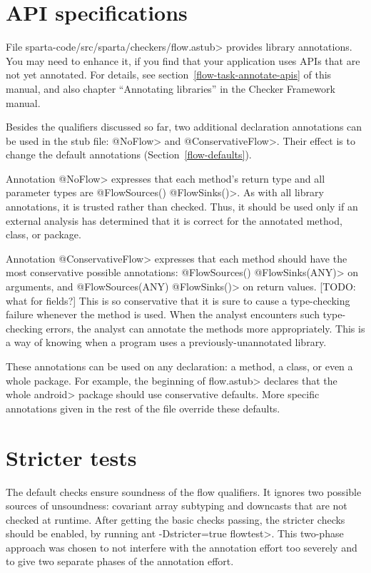 \section{API specifications}

File \<sparta-code/src/sparta/checkers/flow.astub> provides library
annotations.  You may need to enhance it, if you find that your application
uses APIs that are not yet annotated.  For details, see
section~\ref{flow-task-annotate-apis} of this manual, and also 
chapter
``Annotating libraries'' in the Checker Framework manual.

\label{ConservativeFlow}

Besides the qualifiers discussed so far, two additional declaration
annotations can be used in the stub file: \<@NoFlow> and \<@ConservativeFlow>.
Their effect is to change the default annotations (Section~\ref{flow-defaults}).

Annotation \<@NoFlow> expresses that each method's return type and all
parameter types are \<@FlowSources({}) @FlowSinks({})>.  As with all
library annotations, it is trusted rather than checked.  Thus, it should be
used only if an external analysis has determined that it is correct for the
annotated method, class, or package.

Annotation \<@ConservativeFlow> expresses that each method should have the
most conservative possible annotations:
  \<@FlowSources({}) @FlowSinks(ANY)> on arguments, and
  \<@FlowSources(ANY) @FlowSinks({})> on return values.
[TODO: what for fields?]
This is so conservative that it is sure to cause a type-checking failure
whenever the method is used.
When the analyst encounters such type-checking errors, the analyst can
annotate the methods more appropriately.  This is a way of knowing when a
program uses a previously-unannotated library.

These annotations can be used on any declaration: a method, a class,
or even a whole package.
For example, the beginning of \<flow.astub> declares that the
whole \<android> package should use conservative defaults.
More specific annotations given in the rest of the file override these
defaults.


\section{Stricter tests}

The default checks ensure soundness of the flow qualifiers.
It ignores two possible sources of unsoundness: covariant array
subtyping and downcasts that are not checked at runtime.
After getting the basic checks passing, the stricter checks should be
enabled, by running \<ant -Dstricter=true flowtest>.
This two-phase approach was chosen to not interfere with
the annotation effort too severely and to give two separate phases of
the annotation effort.


